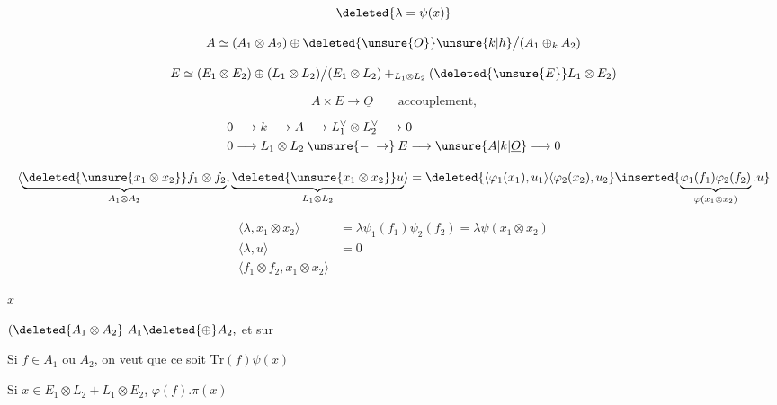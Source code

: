 
\[ \deleted{\lambda=\psi(x)} \]

\[ A\simeq(A_1\otimes A_2)\oplus\deleted{\unsure{O}}\unsure{k|h}\big/(A_1\oplus_k A_2) \]



\[ E\simeq(E_1\otimes E_2)\oplus(L_1\otimes L_2)\big/(E_1\otimes L_2)+_{L_1\otimes L_2}(\deleted{\unsure{E}}L_1\otimes E_2) \]

\[ A\times E\longrightarrow\underline O\qquad\text{accouplement,} \]

\[
\begin{aligned}
0&\longrightarrow k\longrightarrow A\longrightarrow L_1^\vee\otimes L_2^\vee\longrightarrow0\\
0&\longrightarrow L_1\otimes L_2\mathbin{\unsure{-|\to}}E\longrightarrow\unsure{A|k|\underline O}\longrightarrow0
\end{aligned}
\]

\[
\langle\underset{A_1\otimes A_2}{\overset{}{\underbrace{\deleted{\unsure{x_1\otimes x_2}}f_1\otimes f_2}}},
\underset{L_1\otimes L_2}{\underbrace{\deleted{\unsure{x_1\otimes x_2}}u}}\rangle
=\deleted{\langle\varphi_1(x_1),u_1\rangle\langle\varphi_2(x_2),u_2}
\inserted{\underbrace{\varphi_1(f_1)\varphi_2(f_2)}_{\varphi(x_1\otimes x_2)}.u}
\]

\[
\begin{aligned}
\langle\lambda,x_1\otimes x_2\rangle&=\lambda\psi_1(f_1)\psi_2(f_2)=\lambda\psi(x_1\otimes x_2)\\
\langle\lambda,u\rangle&=0\\
\langle f_1\otimes f_2,x_1\otimes x_2\rangle&
\end{aligned}
\]

\quad $x$\quad {}

\qquad {}

$(\deleted{A_1\otimes A_2}\ A_1\deleted{\oplus}A_2,$ et sur

Si $f\in A_1$ ou $A_2$, on veut que ce soit $\mathrm{Tr}(f)\psi(x)$

Si $x\in E_1\otimes L_2+L_1\otimes E_2$,  $\varphi(f).\pi(x)$

